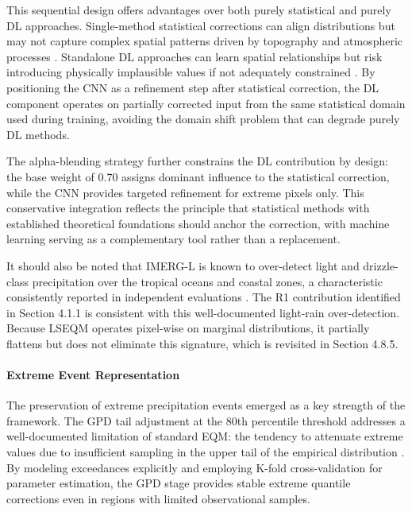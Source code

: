 \documentclass[remotesensing,article,submit,pdftex,moreauthors]{Definitions/mdpi}
\begin{document}
This sequential design offers advantages over both purely statistical
and purely DL approaches. Single-method statistical corrections can
align distributions but may not capture complex spatial patterns driven
by topography and atmospheric processes \cite{ref8,ref44}. Standalone DL
approaches can learn spatial relationships but risk introducing
physically implausible values if not adequately constrained \cite{ref9,ref12}.
By positioning the CNN as a refinement step after statistical
correction, the DL component operates on partially corrected input from
the same statistical domain used during training, avoiding the domain
shift problem that can degrade purely DL methods.

The alpha-blending strategy further constrains the DL contribution by
design: the base weight of 0.70 assigns dominant influence to the
statistical correction, while the CNN provides targeted refinement for
extreme pixels only. This conservative integration reflects the
principle that statistical methods with established theoretical
foundations should anchor the correction, with machine learning serving
as a complementary tool rather than a replacement.

It should also be noted that IMERG-L is known to over-detect light and
drizzle-class precipitation over the tropical oceans and coastal zones,
a characteristic consistently reported in independent evaluations
\cite{ref31,ref32}. The R1 contribution identified in Section 4.1.1 is
consistent with this well-documented light-rain over-detection. Because
LSEQM operates pixel-wise on marginal distributions, it partially
flattens but does not eliminate this signature, which is revisited in
Section 4.8.5.

\paragraph{Extreme Event
Representation}\label{extreme-event-representation}

The preservation of extreme precipitation events emerged as a key
strength of the framework. The GPD tail adjustment at the 80th
percentile threshold addresses a well-documented limitation of standard
EQM: the tendency to attenuate extreme values due to insufficient
sampling in the upper tail of the empirical distribution \cite{ref11}. By
modeling exceedances explicitly and employing K-fold cross-validation
for parameter estimation, the GPD stage provides stable extreme quantile
corrections even in regions with limited observational samples.
\end{document}
